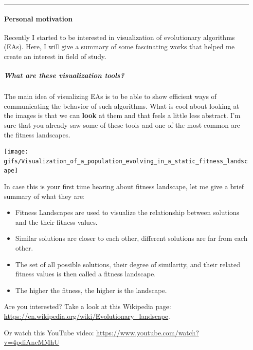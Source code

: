 \documentclass[
]{article}
\providecommand{\tightlist}{%
  \setlength{\itemsep}{0pt}\setlength{\parskip}{0pt}}
\begin{document}
\begin{center}\rule{0.5\linewidth}{0.5pt}\end{center}

\hypertarget{personal-motivation}{%
\paragraph{Personal motivation}\label{personal-motivation}}

Recently I started to be interested in visualization of evolutionary
algorithms (EAs). Here, I will give a summary of some fascinating works
that helped me create an interest in field of study.

\hypertarget{what-are-these-visualization-tools}{%
\subparagraph{What are these visualization
tools?}\label{what-are-these-visualization-tools}}

The main idea of visualizing EAs is to be able to show efficient ways of
communicating the behavior of such algorithms. What is cool about
looking at the images is that we can \textbf{look} at them and that
feels a little less abstract. I'm sure that you already saw some of
these tools and one of the most common are the fitness landscapes.

\begin{center}\texttt{[image: gifs/Visualization\_of\_a\_population\_evolving\_in\_a\_static\_fitness\_landscape]} \end{center}

In case this is your first time hearing about fitness landscape, let me
give a brief summary of what they are:

\begin{itemize}
\tightlist
\item
  Fitness Landscapes are used to visualize the relationship between
  solutions and the their fitness values.
\item
  Similar solutions are closer to each other, different solutions are
  far from each other.
\item
  The set of all possible solutions, their degree of similarity, and
  their related fitness values is then called a fitness landscape.
\item
  The higher the fitness, the higher is the landscape.
\end{itemize}

Are you interested? Take a look at this Wikipedia page:
\url{https://en.wikipedia.org/wiki/Evolutionary_landscape}.

Or watch this YouTube video:
\url{https://www.youtube.com/watch?v=4pdiAneMMhU}
\end{document}
